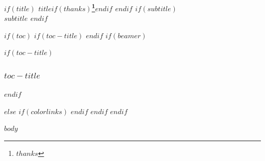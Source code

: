 \documentclass{article}%
\begin{document}
	
	
	\begin{center}
		\textbf{$if(title)$ $title$$if(thanks)$\thanks{$thanks$}$endif$ $endif$ $if(subtitle)$\\ $subtitle$ $endif$}
	\end{center}
	
	$if(toc)$
	$if(toc-title)$
	\renewcommand*\contentsname{$toc-title$}
	$endif$
	$if(beamer)$
	\begin{frame}[allowframebreaks]
		$if(toc-title)$
		\frametitle{$toc-title$}
		$endif$
		\tableofcontents[hideallsubsections]
	\end{frame}
	$else$
	{
		$if(colorlinks)$
		\hypersetup{linkcolor=$if(toccolor)$$toccolor$$else$$endif$}
		$endif$
		\setcounter{tocdepth}{$toc-depth$}
		\tableofcontents
	}
	$endif$
	$endif$
	
	$body$
	
\end{document}
